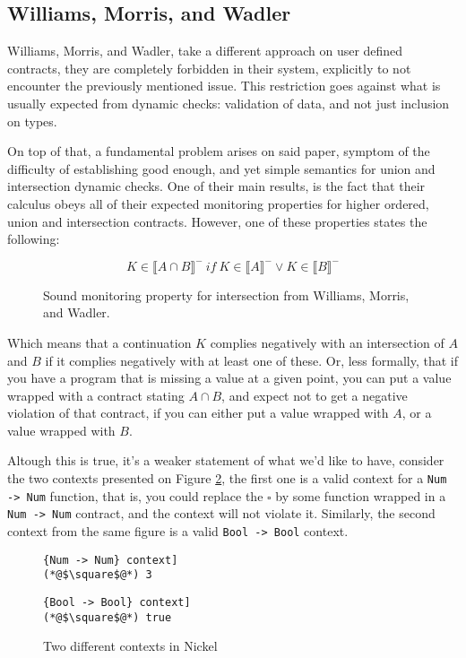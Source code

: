 \documentclass[sigplan,10pt,review,anonymous]{acmart}
\newcommand{\unsure}[2][1=]{}
\newcommand{\nickel}[1]{\lstinline[language=nickel]{#1}}
\begin{document}
\subsection{Williams, Morris, and Wadler}
\label{sec:will-morr-wadl}
\unsure{Subsection title?}

Williams, Morris, and Wadler, take a different approach on user defined contracts,
they are completely forbidden in their system, explicitly to not encounter
the previously mentioned issue.
This restriction goes against what is usually expected from dynamic checks:
validation of data, and not just inclusion on types.

On top of that, a fundamental problem arises on said paper,
symptom of the difficulty of establishing good enough, and yet
simple semantics for union and intersection dynamic checks.
One of their main results, is the fact that their calculus obeys
all of their expected monitoring properties for higher ordered, union
and intersection contracts.
However, one of these properties states the following:

\begin{figure}[h]
$$ K \in \llbracket A \cap B \rrbracket^-~if~K \in \llbracket A \rrbracket^- \lor K \in \llbracket B \rrbracket^- $$
\caption{Sound monitoring property for intersection from Williams, Morris, and Wadler.}
\label{fig:wmw-semantics}
\end{figure}

Which means that a continuation $K$ complies negatively with an
intersection of $A$ and $B$ if it complies negatively with at least one of these.
Or, less formally, that if you have a program that is missing a value at a given point,
you can put a value wrapped with a contract stating $A \cap B$,
and expect not to get a negative violation of that contract,
if you can either put a value
wrapped with $A$, or a value wrapped with $B$.

Altough this is true, it's a weaker statement of what we'd like to have,
consider the two contexts presented on Figure \ref{fig:valid-contexts},
the first one is a valid context for a \nickel{Num -> Num} function,
that is, you could replace the $\square$ by some function wrapped in a
\nickel{Num -> Num} contract, and the context will not violate it.
Similarly, the second context from the same figure is a valid
\nickel{Bool -> Bool} context.

\begin{figure}[h]
\begin{lstlisting}[language=nickel, title=\nickel{Num -> Num} context]
(*@$\square$@*) 3
\end{lstlisting}
\begin{lstlisting}[language=nickel, title=\nickel{Bool -> Bool} context]
(*@$\square$@*) true
\end{lstlisting}
\caption{Two different contexts in Nickel}
\label{fig:valid-contexts}
\end{figure}
\end{document}
